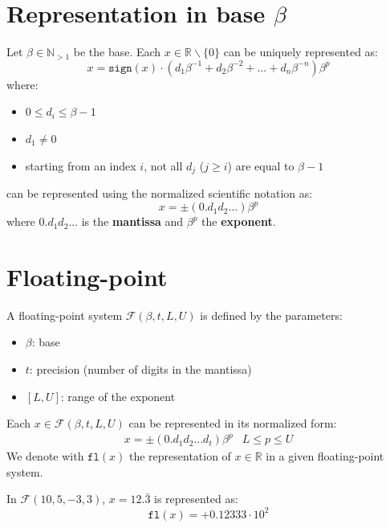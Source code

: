 \section{Representation in base \texorpdfstring{$\beta$}{B}}

Let $\beta \in \mathbb{N}_{> 1}$ be the base.
Each $x \in \mathbb{R} \smallsetminus \{0\}$ can be uniquely represented as:
\begin{equation}
    \label{eq:finnum_b_representation}
    x = \texttt{sign}(x) \cdot (d_1\beta^{-1} + d_2\beta^{-2} + \dots + d_n\beta^{-n})\beta^p
\end{equation}
where:
\begin{itemize}
    \item $0 \leq d_i \leq \beta-1$
    \item $d_1 \neq 0$
    \item starting from an index $i$, not all $d_j$ ($j \geq i$) are equal to $\beta-1$
\end{itemize}
%
 can be represented using the normalized scientific notation as: 
\[
    x = \pm (0.d_1d_2\dots) \beta^p
\]
where $0.d_1d_2\dots$ is the \textbf{mantissa} and $\beta^p$ the \textbf{exponent}. 



\section{Floating-point}
A floating-point system $\mathcal{F}(\beta, t, L, U)$ is defined by the parameters: 
\begin{itemize}
    \item $\beta$: base
    \item $t$: precision (number of digits in the mantissa)
    \item $[L, U]$: range of the exponent
\end{itemize}

Each $x \in \mathcal{F}(\beta, t, L, U)$ can be represented in its normalized form:
\begin{eqnarray}
    x = \pm (0.d_1d_2 \dots d_t) \beta^p & L \leq p \leq U
\end{eqnarray}
We denote with $\texttt{fl}(x)$ the representation of $x \in \mathbb{R}$ in a given floating-point system.

\begin{example}
    In $\mathcal{F}(10, 5, -3, 3)$, $x=12.\bar{3}$ is represented as:
    \begin{equation*}
        \texttt{fl}(x) = + 0.12333 \cdot 10^2
    \end{equation*}
\end{example}


